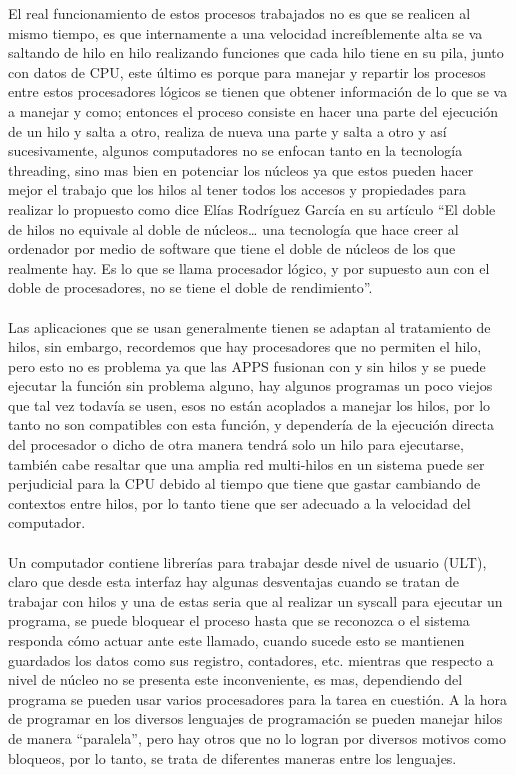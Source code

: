 \documentclass[12pt]{letter}
\begin{document}
El real funcionamiento de estos procesos trabajados no es que se realicen al mismo tiempo, es que internamente a una velocidad increíblemente alta se va saltando de hilo en hilo realizando funciones que cada hilo tiene en su pila, junto con datos de CPU, este último es porque para manejar y repartir los procesos entre estos procesadores lógicos se tienen que obtener información de lo que se va a manejar y como; entonces el proceso consiste en hacer una parte del ejecución de un hilo y salta a otro, realiza de nueva una parte y salta a otro y así sucesivamente, algunos computadores no se enfocan tanto en la tecnología threading, sino mas bien en potenciar los núcleos ya que estos pueden hacer mejor el trabajo que los hilos al tener todos los accesos y propiedades para realizar lo propuesto como dice Elías Rodríguez García en su artículo “El doble de hilos no equivale al doble de núcleos… una tecnología que hace creer al ordenador por medio de software que tiene el doble de núcleos de los que realmente hay. Es lo que se llama procesador lógico, y por supuesto aun con el doble de procesadores, no se tiene el doble de rendimiento”.\\\\
Las aplicaciones que se usan generalmente tienen se adaptan al tratamiento de hilos, sin embargo, recordemos que hay procesadores que no permiten el hilo, pero esto no es problema ya que las APPS fusionan con y sin hilos y se puede ejecutar la función sin problema alguno, hay algunos programas un poco viejos que tal vez todavía se usen, esos no están acoplados a manejar los hilos, por lo tanto no son compatibles con esta función, y dependería de la ejecución directa del procesador o dicho de otra manera tendrá solo un hilo para ejecutarse, también cabe resaltar que una amplia red multi-hilos en un sistema puede ser perjudicial para la CPU debido al tiempo que tiene que gastar cambiando de contextos entre hilos, por lo tanto tiene que ser adecuado a la velocidad del computador.\\\\
Un computador contiene librerías para trabajar desde nivel de usuario (ULT), claro que desde esta interfaz hay algunas desventajas cuando se tratan de trabajar con hilos y una de estas seria que al realizar un syscall para ejecutar un programa, se puede bloquear el proceso hasta que se reconozca o el sistema responda cómo actuar ante este llamado, cuando sucede esto se mantienen guardados los datos como sus registro, contadores, etc. mientras que respecto a nivel de núcleo no se presenta este inconveniente, es mas, dependiendo del programa se pueden usar varios procesadores para la tarea en cuestión. A la hora de programar en los diversos lenguajes de programación se pueden manejar hilos de manera “paralela”, pero hay otros que no lo logran por diversos motivos como bloqueos, por lo tanto, se trata de diferentes maneras entre los lenguajes.
\end{document}
